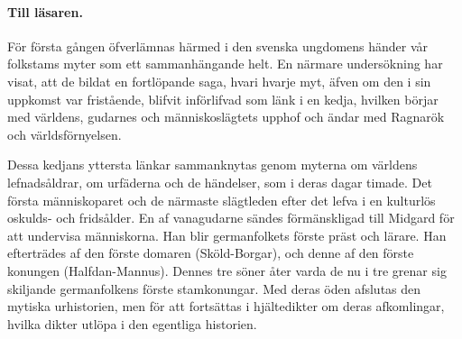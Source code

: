 \protect\hypertarget{lb1625905.xhtmlux5cux23startIII}{}{}\protect\hypertarget{lb1625905.xhtmlux5cux23startIII-a}{}{}\protect\hypertarget{lb1625905.xhtmlux5cux23startIII-b}{}{}\protect\hypertarget{lb1625905.xhtmlux5cux23startIII-c}{}{}\protect\hypertarget{lb1625905.xhtmlux5cux23startIII-d}{}{}

\paragraph{Till läsaren.}

{F}ör första gången öfverlämnas härmed i den svenska ungdomens händer
vår folkstams myter som ett sammanhängande helt. En närmare undersökning
har visat, att de bildat en fortlöpande saga, hvari hvarje myt, äfven om
den i sin uppkomst var fristående, blifvit införlifvad som länk i en
kedja, hvilken börjar med världens, gudarnes och människoslägtets upphof
och ändar med Ragnarök och världsförnyelsen.

Dessa kedjans yttersta länkar sammanknytas genom myterna om världens
lefnadsåldrar, om urfäderna och de händelser, som i deras dagar timade.
Det första människoparet och de närmaste slägtleden efter det lefva i en
kulturlös oskulds- och fridsålder. En af vanagudarne sändes
förmänskligad till Midgard för att undervisa människorna. Han blir
germanfolkets förste präst och lärare. Han efterträdes af den förste
domaren (Sköld-Borgar), och denne af den förste konungen
(Halfdan-Mannus). Dennes tre söner åter varda de nu i tre grenar sig
skiljande germanfolkens förste stamkonungar. Med deras öden afslutas den
mytiska urhistorien, men för att
\protect\hypertarget{lb1625905.xhtmlux5cux23startIV}{}{}\protect\hypertarget{lb1625905.xhtmlux5cux23startIV-a}{}{}\protect\hypertarget{lb1625905.xhtmlux5cux23startIV-b}{}{}\protect\hypertarget{lb1625905.xhtmlux5cux23startIV-c}{}{}\protect\hypertarget{lb1625905.xhtmlux5cux23startIV-d}{}{}
fortsättas i hjältedikter om deras afkomlingar, hvilka dikter utlöpa i
den egentliga historien.

